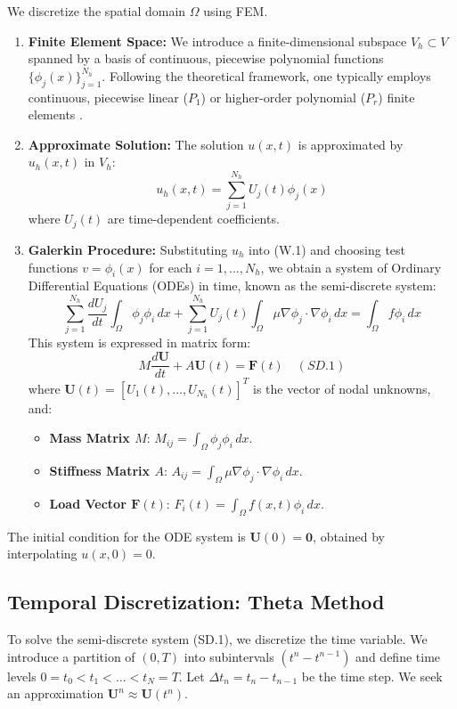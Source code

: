 \documentclass[
  11pt,
]{article}
\begin{document}
We discretize the spatial domain $\Omega$ using FEM.
\begin{enumerate}
\item \textbf{Finite Element Space:} We introduce a finite-dimensional subspace
$V_h \subset V$ spanned by a basis of continuous, piecewise polynomial
functions $\{\phi_j(x)\}_{j=1}^{N_h}$. Following the theoretical framework, one typically employs continuous, piecewise linear ($P_1$) or higher-order polynomial ($P_r$) finite elements \cite{picasso1998}.
\item \textbf{Approximate Solution:}
The solution $u(x,t)$ is approximated by $u_h(x,t)$ in $V_h$: \[
    u_h(x, t) = \sum_{j=1}^{N_h} U_j(t) \phi_j(x)
    \] where $U_j(t)$ are time-dependent coefficients.
\item \textbf{Galerkin Procedure:} Substituting $u_h$ into (W.1) and
choosing test functions $v = \phi_i(x)$ for each $i=1, \dots, N_h$,
we obtain a system of Ordinary Differential Equations (ODEs) in time,
known as the semi-discrete system: \[
    \sum_{j=1}^{N_h} \frac{d U_j}{d t} \int_{\Omega} \phi_j \phi_i \, dx + \sum_{j=1}^{N_h} U_j(t) \int_{\Omega} \mu \nabla \phi_j \cdot \nabla \phi_i \, dx = \int_{\Omega} f \phi_i \, dx
    \] This system is expressed in matrix form: \[
    M \frac{d\mathbf{U}}{dt} + A \mathbf{U}(t) = \mathbf{F}(t) \quad (SD.1)
    \] where $\mathbf{U}(t) = [U_1(t), \dots, U_{N_h}(t)]^T$ is the
vector of nodal unknowns, and:
\begin{itemize}
\item \textbf{Mass Matrix $M$}: $M_{ij} = \int_{\Omega} \phi_j \phi_i \, dx$.
\item \textbf{Stiffness Matrix $A$}: $A_{ij} = \int_{\Omega} \mu \nabla \phi_j \cdot \nabla \phi_i \, dx$.
\item \textbf{Load Vector $\mathbf{F}(t)$}: $F_i(t) = \int_{\Omega} f(x,t) \phi_i \, dx$.
\end{itemize}
\end{enumerate}

The initial condition for the ODE system is
$\mathbf{U}(0)=\mathbf{0}$, obtained by interpolating $u(x,0)=0$.

\subsection{Temporal Discretization: Theta Method}

To solve the semi-discrete system (SD.1), we discretize the time
variable. We introduce a partition of $(0,T)$ into subintervals
$(t^n-t^{n-1})$ and define time levels
$0=t_0 < t_1 < \dots < t_N=T$. Let $\Delta t_n = t_n - t_{n-1}$ be
the time step. We seek an approximation
$\mathbf{U}^n \approx \mathbf{U}(t^n)$.
\end{document}
